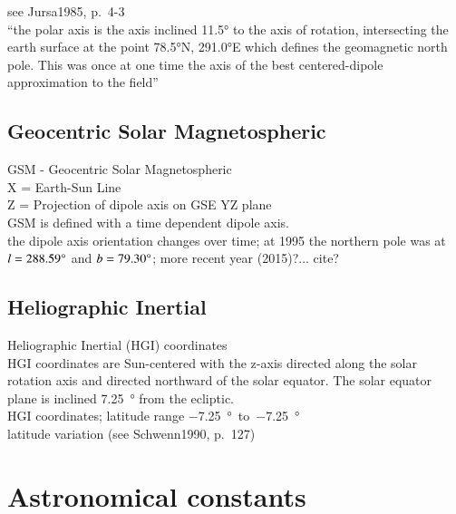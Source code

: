 see Jursa1985, p.~4-3\\
``the polar axis is the axis inclined 11.5° to the axis of rotation, intersecting the earth surface at the point 78.5°N, 291.0°E which defines the geomagnetic north pole. This was once at one time the axis of the best centered-dipole approximation to the field''\\


\subsection{Geocentric Solar Magnetospheric}

GSM - Geocentric Solar Magnetospheric\\
X = Earth-Sun Line\\
Z = Projection of dipole axis on GSE YZ plane\\

GSM is defined with a time dependent dipole axis.\\
the dipole axis orientation changes over time; at 1995 the northern pole was at $l = 288.59\degree$ and $b = 79.30\degree$; more recent year (2015)?... cite?\\

\subsection{Heliographic Inertial}

Heliographic Inertial (HGI) coordinates\\
HGI coordinates are Sun-centered with the z-axis directed along the solar rotation axis and directed northward of the solar equator. The solar equator plane is inclined \SI{7.25}{\degree} from the ecliptic.\\

HGI coordinates; latitude range \SI{-7.25}{\degree}~to~\SI{-7.25}{\degree}\\
latitude variation (see Schwenn1990, p.~127)\\



\section{Astronomical constants}
\label{sec:astronomical_constants}

